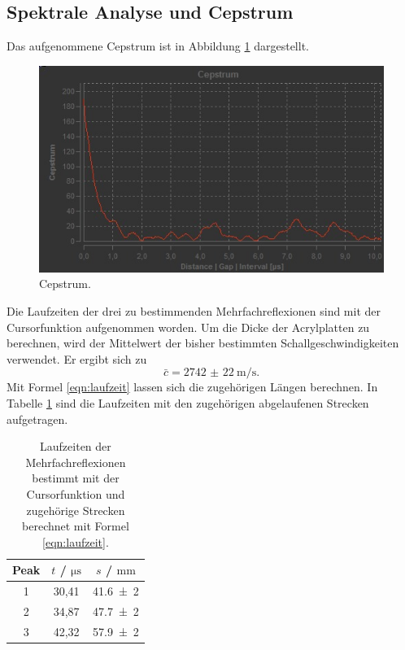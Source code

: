 \subsection{Spektrale Analyse und Cepstrum}
Das aufgenommene Cepstrum ist in Abbildung \ref{fig:cepstrum} dargestellt.
\begin{figure}
  \centering
  \includegraphics{Messdaten/cepstrum.jpg}
  \caption{Cepstrum.}
  \label{fig:cepstrum}
\end{figure}
Die Laufzeiten der drei zu bestimmenden Mehrfachreflexionen sind mit der Cursorfunktion
aufgenommen worden. Um die Dicke der Acrylplatten zu berechnen, wird der Mittelwert der 
bisher bestimmten Schallgeschwindigkeiten verwendet. Er ergibt sich zu
\begin{equation*}
	\bar{c} = \SI{2742(22)}{\meter\per\second} \mathrm{.}
\end{equation*}
Mit Formel \eqref{eqn:laufzeit} lassen sich die zugehörigen Längen berechnen.
In Tabelle \ref{tab:cepstrum} sind die Laufzeiten mit den zugehörigen abgelaufenen Strecken
aufgetragen.
\begin{table}
\centering
	\caption{Laufzeiten der Mehrfachreflexionen bestimmt mit der Cursorfunktion und zugehörige Strecken berechnet mit Formel \eqref{eqn:laufzeit}.}
\label{tab:cepstrum}
	\begin{tabular}{ccc}
	\toprule
	Peak & $t$ / $\si{\micro\second}$ & $s$ / $\si{\milli\meter}$ \\
	\midrule
		1 & 30,41 & \num{41,6(2)} \\
		2 & 34,87 & \num{47,7(2)} \\
		3 & 42,32 & \num{57,9(2)} \\
	\bottomrule
	\end{tabular}
\end{table}
